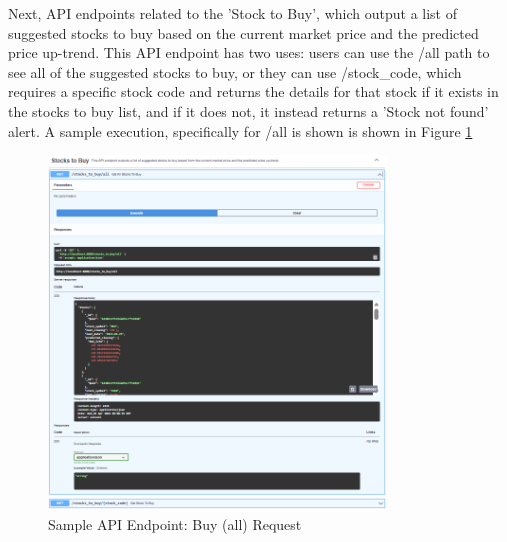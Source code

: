 Next, API endpoints related to the 'Stock to Buy', which output a list of 
suggested stocks to buy based on the current market price and the 
predicted price up-trend. This API endpoint has two uses: users can 
use the /all path to see all of the suggested stocks to buy, or 
they can use /stock\_code, which requires a specific stock code 
and returns the details for that stock if it exists in the stocks to buy list, 
and if it does not, it instead returns a 'Stock not found' alert.
A sample execution, specifically for
/all is shown is shown in Figure \ref{fig:alamAPI_buy}
\begin{figure}[ht]
    \centering
    \includegraphics[width=0.80\textwidth]{./assets/Chapter_4/Documentation/alamAPI_buy.png}
    \caption{Sample API Endpoint: Buy (all) Request}
    \label{fig:alamAPI_buy}
\end{figure}
\FloatBarrier

